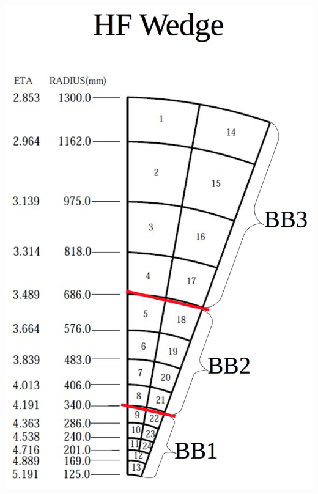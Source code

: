 \documentclass[bigger]{beamer}
\begin{document}
\begin{frame}
\begin{columns}
\begin{column}{0.35\textwidth}
\centering
\includegraphics[width=\textwidth]{fig/hf_local/hf_bb_2.png}
\end{column}
\end{columns}
\end{frame}
\end{document}
